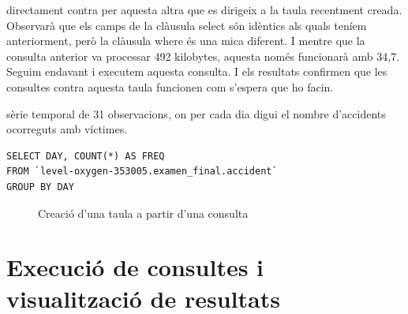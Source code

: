 \documentclass[12pt,longbibliography]{article}
\theoremstyle{definition}
\theoremstyle{remark}
\begin{document}
directament contra per aquesta altra que es dirigeix a la taula recentment creada. Observarà que els camps de la clàusula select són idèntics als quals teníem anteriorment, però la clàusula where és una mica diferent. I mentre que la consulta anterior va processar 492 kilobytes, aquesta només funcionarà amb 34,7. Seguim endavant i executem aquesta consulta. I els resultats confirmen que les consultes contra aquesta taula funcionen com s'espera que ho facin.

sèrie temporal de 31 observacions, on per cada dia digui el nombre d’accidents ocorreguts amb víctimes.

\begin{verbatim}
SELECT DAY, COUNT(*) AS FREQ
FROM `level-oxygen-353005.examen_final.accident`
GROUP BY DAY
\end{verbatim}

\vspace{2mm}
\begin{figure}[h!]
\par
{}%
\hfill
{}%
\par

\caption{Creació d'una taula a partir d'una consulta}
\label{fig:bq17}
\end{figure}
\vspace{2mm}


\newpage

\section{Execució de consultes i visualització de resultats}
\end{document}
